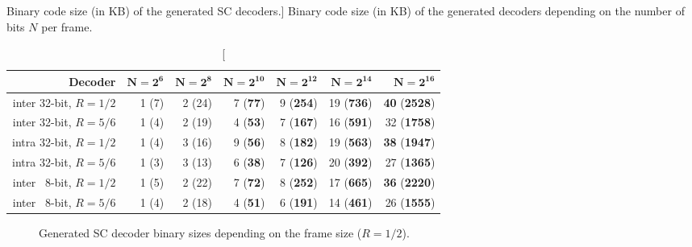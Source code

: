 \begin{table}[htp]
  \centering
  \caption
    [Binary code size (in KB) of the generated SC decoders.]
    {Binary code size (in KB) of the generated decoders depending on the number
     of bits $N$ per frame.}
  \label{tab:eval_polar_sc_gen_l1i_size}
  \begin{tabular}{r r r r r r r}
    \textbf{Decoder}         & $\bm{N = 2^6}$ & $\bm{N = 2^8}$ & $\bm{N = 2^{10}}$ & $\bm{N = 2^{12}}$ & $\bm{N = 2^{14}}$ & $\bm{N = 2^{16}}$           \\
    \hline
    \hline
    inter 32-bit, $R = 1/2$  & 1 (7)          & 2 (24)         & 7 (\textbf{77})   & 9 (\textbf{254})  & 19 (\textbf{736}) & \textbf{40} (\textbf{2528}) \\
    inter 32-bit, $R = 5/6$  & 1 (4)          & 2 (19)         & 4 (\textbf{53})   & 7 (\textbf{167})  & 16 (\textbf{591}) & 32          (\textbf{1758}) \\
    intra 32-bit, $R = 1/2$  & 1 (4)          & 3 (16)         & 9 (\textbf{56})   & 8 (\textbf{182})  & 19 (\textbf{563}) & \textbf{38} (\textbf{1947}) \\
    intra 32-bit, $R = 5/6$  & 1 (3)          & 3 (13)         & 6 (\textbf{38})   & 7 (\textbf{126})  & 20 (\textbf{392}) & 27          (\textbf{1365}) \\
    inter ~8-bit, $R = 1/2$  & 1 (5)          & 2 (22)         & 7 (\textbf{72})   & 8 (\textbf{252})  & 17 (\textbf{665}) & \textbf{36} (\textbf{2220}) \\
    inter ~8-bit, $R = 5/6$  & 1 (4)          & 2 (18)         & 4 (\textbf{51})   & 6 (\textbf{191})  & 14 (\textbf{461}) & 26          (\textbf{1555}) \\
  \end{tabular}
\end{table}

\begin{figure}[htp]
  \centering
  \quad
  \caption
    {Generated SC decoder binary sizes depending on the frame size
     ($R=1/2$).}
  \label{plot:eval_polar_sc_gen_l1i_size}
\end{figure}

